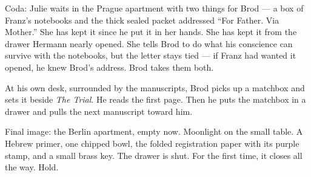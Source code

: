 Coda: Julie waits in the Prague apartment with two things for Brod --- a box of Franz's notebooks and the thick sealed packet addressed ``For Father. Via Mother.'' She has kept it since he put it in her hands. She has kept it from the drawer Hermann nearly opened. She tells Brod to do what his conscience can survive with the notebooks, but the letter stays tied --- if Franz had wanted it opened, he knew Brod's address. Brod takes them both.

At his own desk, surrounded by the manuscripts, Brod picks up a matchbox and sets it beside \textit{The Trial}. He reads the first page. Then he puts the matchbox in a drawer and pulls the next manuscript toward him.

Final image: the Berlin apartment, empty now. Moonlight on the small table. A Hebrew primer, one chipped bowl, the folded registration paper with its purple stamp, and a small brass key. The drawer is shut. For the first time, it closes all the way. Hold.
